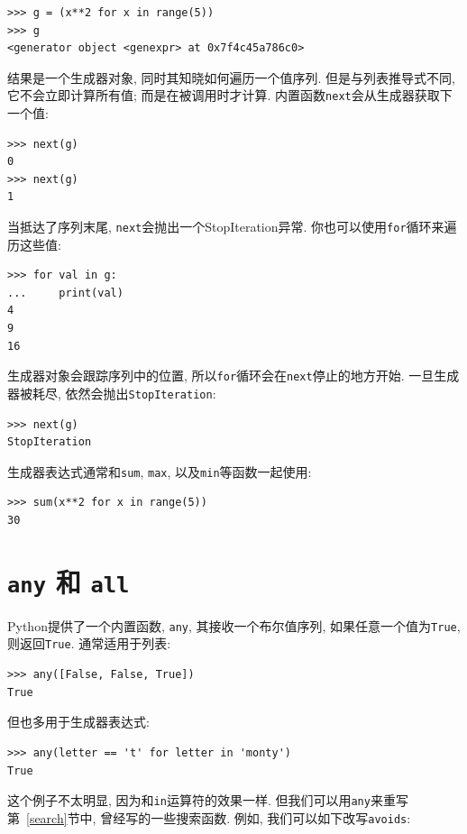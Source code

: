 \documentclass[10pt]{book}
\begin{document}
\begin{verbatim}
>>> g = (x**2 for x in range(5))
>>> g
<generator object <genexpr> at 0x7f4c45a786c0>
\end{verbatim}
%
结果是一个生成器对象, 同时其知晓如何遍历一个值序列. 
但是与列表推导式不同, 它不会立即计算所有值; 而是在被调用时才计算. 
内置函数{\tt next}会从生成器获取下一个值:

\begin{verbatim}
>>> next(g)
0
>>> next(g)
1
\end{verbatim}
%
当抵达了序列末尾, {\tt next}会抛出一个StopIteration异常. 
你也可以使用{\tt for}循环来遍历这些值:

\begin{verbatim}
>>> for val in g:
...     print(val)
4
9
16
\end{verbatim}
%
生成器对象会跟踪序列中的位置, 
所以{\tt for}循环会在{\tt next}停止的地方开始. 
一旦生成器被耗尽, 依然会抛出{\tt StopIteration}:

\begin{verbatim}
>>> next(g)
StopIteration
\end{verbatim}

生成器表达式通常和{\tt sum},
{\tt max}, 以及{\tt min}等函数一起使用:

\begin{verbatim}
>>> sum(x**2 for x in range(5))
30
\end{verbatim}


\section{{\tt any} 和 {\tt all}}

Python提供了一个内置函数, {\tt any}, 其接收一个布尔值序列, 
如果任意一个值为{\tt True}, 则返回{\tt True}. 通常适用于列表:

\begin{verbatim}
>>> any([False, False, True])
True
\end{verbatim}
%
但也多用于生成器表达式:

\begin{verbatim}
>>> any(letter == 't' for letter in 'monty')
True
\end{verbatim}
%
这个例子不太明显, 因为和{\tt in}运算符的效果一样. 
但我们可以用{\tt any}来重写第~\ref{search}节中, 曾经写的一些搜索函数. 
例如, 我们可以如下改写{\tt avoids}:
\end{document}
